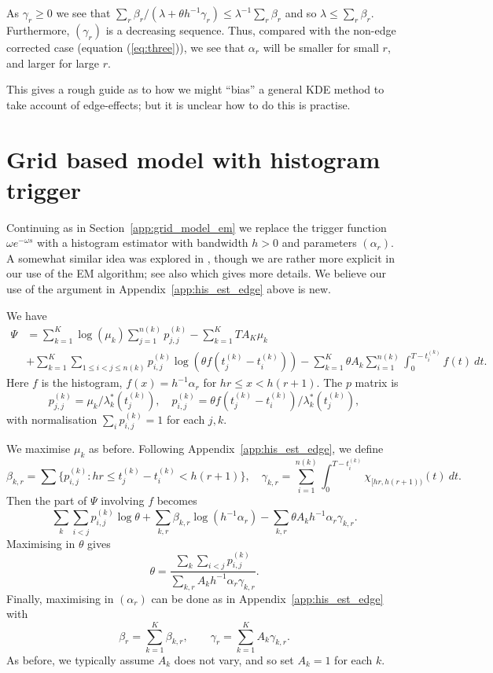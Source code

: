 \documentclass[twoside,a4paper]{article}
\theoremstyle{plain}
\theoremstyle{definition}
\begin{document}
As $\gamma_r\geq 0$ we see that $\sum_r \beta_r / (\lambda+\theta h^{-1}\gamma_r) \leq \lambda^{-1}
\sum_r \beta_r$ and so $\lambda \leq \sum_r \beta_r$.  Furthermore, $(\gamma_r)$ is a decreasing
sequence.  Thus, compared with the non-edge corrected case (equation (\ref{eq:three})),
we see that $\alpha_r$ will be smaller for small $r$, and larger for large $r$.

This gives a rough guide as to how we might ``bias'' a general KDE method to take account of
edge-effects; but it is unclear how to do this is practise.





\section{Grid based model with histogram trigger}\label{app:grid_hist}

Continuing as in Section~\ref{app:grid_model_em} we replace
the trigger function $\omega e^{-\omega s}$
with a histogram estimator with bandwidth $h>0$ and parameters $(\alpha_r)$.
A somewhat similar idea was explored in \cite{ml2}, though we are rather more explicit
in our use of the EM algorithm; see also \cite{ml} which gives more details.
We believe our use of the argument in Appendix~\ref{app:his_est_edge} above is new.

We have
\begin{align*}
\Psi &= \sum_{k=1}^K \log(\mu_k) \sum_{j=1}^{n(k)} p^{(k)}_{j,j}
  - \sum_{k=1}^K TA_K\mu_k \\
&+\sum_{k=1}^K \sum_{1\leq i<j\leq n(k)} p^{(k)}_{i,j} \log(\theta f(t^{(k)}_j - t^{(k)}_i))
- \sum_{k=1}^K \theta A_k \sum_{i=1}^{n(k)} \int_0^{T-t^{(k)}_i} f(t) \ dt.
\end{align*}
Here $f$ is the histogram, $f(x) = h^{-1}\alpha_r$ for $hr \leq x < h(r+1)$.
The $p$ matrix is
\[ p^{(k)}_{j,j} = \mu_k / \lambda^*_k(t^{(k)}_j), \quad
p^{(k)}_{i,j} = \theta f(t^{(k)}_j - t^{(k)}_i) / \lambda^*_k(t^{(k)}_j), \]
with normalisation $\sum_i p^{(k)}_{i,j} = 1$ for each $j,k$.

We maximise $\mu_k$ as before.  Following Appendix~\ref{app:his_est_edge}, we define
\[ \beta_{k,r} = \sum \big\{ p^{(k)}_{i,j} : hr \leq t^{(k)}_j - t^{(k)}_i
< h(r+1) \big\}, \quad
\gamma_{k,r} = \sum_{i=1}^{n(k)} \int_0^{T-t^{(k)}_i}
\chi_{[hr,h(r+1))}(t) \ dt. \]
Then the part of $\Psi$ involving $f$ becomes
\[ \sum_k \sum_{i<j} p^{(k)}_{i,j} \log\theta
+ \sum_{k,r} \beta_{k,r} \log(h^{-1}\alpha_r)
- \sum_{k,r} \theta A_k h^{-1} \alpha_r \gamma_{k,r}. \]
Maximising in $\theta$ gives
\[ \theta = \frac{\sum_k \sum_{i<j} p^{(k)}_{i,j}}{\sum_{k,r} A_k h^{-1}\alpha_r\gamma_{k,r}}. \]
Finally, maximising in $(\alpha_r)$ can be done as in Appendix~\ref{app:his_est_edge}
with
\[ \beta_r = \sum_{k=1}^K \beta_{k,r}, 
\qquad
\gamma_r = \sum_{k=1}^K A_k \gamma_{k,r}. \]
As before, we typically assume $A_k$ does not vary, and so set $A_k=1$ for each $k$.
\end{document}
